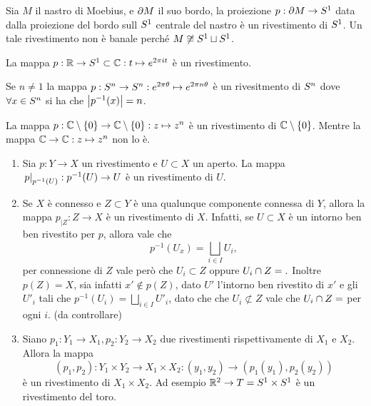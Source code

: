 \documentclass[]{article}
\begin{document}
\begin{example}  \nl
    Sia $M$ il nastro di Moebius, e $\partial M$ il suo bordo, la proiezione $p: \partial M \to S^{1}$ data dalla proiezione
    del bordo sull $S^{1}$ centrale del nastro \`e un rivestimento di $S^{1}$. \nl
    Un tale rivestimento non \`e banale perch\'e $M \not\cong S^{1} \sqcup S^{1}$.
\end{example}

\begin{example}  \nl
    La mappa $p: \mathbb{R} \to S^{1} \subset \mathbb{C}: t \mapsto e^{2 \pi i t}$ \`e un rivestimento.
\end{example}

\begin{example}  \nl
    Se $n \neq 1$ la mappa $p: S^{n} \to S^{n}: e^{2 \pi \theta} \mapsto e^{2 \pi n \theta}$ \`e un rivesitmento
    di $S^{n}$ dove $\forall x \in S^{n}$ si ha che $\left| p^{-1}(x) \right| = n$. 
\end{example}

\begin{example}  \nl
    La mappa $p: \mathbb{C} \setminus \left\{ 0 \right\} \to \mathbb{C} \setminus \left\{ 0 \right\}: z \mapsto z^n$ \`e un rivestimento di $\mathbb{C} \setminus \left\{ 0 \right\}$.
    Mentre la mappa $\mathbb{C} \to \mathbb{C}: z \mapsto z^n$ non lo \`e.
\end{example}

\begin{proposition}  \nl
    \begin{enumerate}
        \item Sia $p: Y \to X$ un rivestimento e $U \subset X$ un aperto. \nl
        La mappa $\left. p \right|_{p^{-1}(U)}: p^{-1}(U) \to U$ \`e un rivestimento di $U$.
        \item Se $X$ \`e connesso e $Z \subset Y$ \`e una qualunque componente connessa di $Y$, allora 
        la mappa $p_{\big| Z}: Z \to X$ \`e un rivestimento di $X$. \nl
        Infatti, se $U \subset X$ \`e un intorno ben ben rivestito per $p$, allora vale che
        \[
            p^{-1}(U_x) = \bigsqcup_{i \in I} U_i,
        \]
        per connessione di $Z$ vale per\`o che $U_i \subset Z$ oppure $U_i \cap Z = \empty.$ \nl
        Inoltre $p(Z) = X$, sia infatti $x' \not\in p(Z)$, dato $U'$ l'intorno ben rivestito di $x'$ e
        gli $U'_i$ tali che $p^{-1}(U_i) = \bigsqcup_{i \in I} U'_i$, dato che che $U_i \not\subset Z$ vale che
        $U_i \cap Z = \empty $ per ogni $i$. (da controllare)
        \item Siano $p_1: Y_1 \to X_1, p_2: Y_2 \to X_2$ due rivestimenti rispettivamente di $X_1$ e $X_2$. Allora la mappa
        \[  
            \left(p_1, p_2\right): Y_1 \times Y_2 \to X_1 \times X_2: (y_1, y_2) \to (p_1(y_1), p_2(y_2))
        \]
        \`e un rivestimento di $X_1 \times X_2$. \nl
        Ad esempio $\mathbb{R}^2 \to T = S^{1} \times S^{1}$ \`e un rivestimento del toro.

    \end{enumerate}
\end{proposition}
\end{document}
